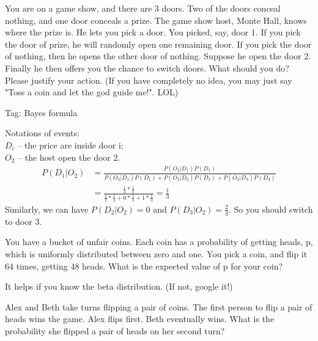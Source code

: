\begin{exe}
You are on a game show, and there are 3 doors. Two of the doors conceal nothing, and one door conceals a prize. The game show host, Monte Hall, knows where the prize is. He lets you pick a door. You picked, say, door 1. If you pick the door of prize, he will randomly open one remaining door. If you pick the door of nothing, then he opens the other door of nothing. Suppose he open the door 2. Finally he then offers you the chance to switch doors. What should you do? Please justify your action. (If you have completely no idea, you may just say "Toss a coin and let the god guide me!". LOL) 
\end{exe}
\begin{teacher}
Tag: Bayes formula
\begin{sol}
Notations of events:\\
$D_i$ -- the price are inside door i;\\
$O_2$ -- the host open the door 2.
\begin{align*}
    P(D_1|O_2) &= \frac{P(O_2|D_1)P(D_1)}{P(O_2|D_1)P(D_1)+P(O_2|D_2)P(D_2)+P(O_2|D_3)P(D_3)}\\
    &=\frac{\frac{1}{2}*\frac{1}{3}}{\frac{1}{2}*\frac{1}{3}+0*\frac{1}{3}+1*\frac{1}{3}}=\frac{1}{3}
\end{align*}
Similarly, we can have $P(D_2|O_2)=0$ and $P(D_3|O_2) = \frac{2}{3}$. So you should switch to door 3.
\end{sol}
\end{teacher}

\begin{exe}
You have a bucket of unfair coins. Each coin has a probability of getting heads, p, which is uniformly distributed between zero and one. You pick a coin, and flip it 64 times, getting 48 heads. What is the expected value of p for your coin?
\end{exe}
\begin{teacher}
\begin{sol}
It helps if you know the beta distribution. (If not, google it!)
\end{sol}
\end{teacher}

\begin{exe}
Alex and Beth take turns flipping a pair of coins. The first person to flip a pair of heads wins the game. Alex flips first. Beth eventually wins. What is the probability she flipped a pair of heads on her second turn?
\end{exe}
\begin{teacher}
\begin{sol}
\end{sol}
\end{teacher}

